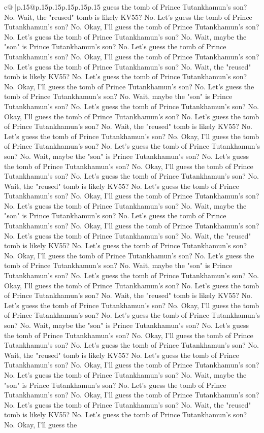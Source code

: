 \documentclass{article}
\begin{document}
{\begin{supertabular}{c@{$\;$}|p{.15\linewidth}@{}p{.15\linewidth}p{.15\linewidth}p{.15\linewidth}p{.15\linewidth}p{.15\linewidth}}
{{{guess the tomb of Prince Tutankhamun's son? No. Wait, the "reused" tomb is likely KV55? No. Let's guess the tomb of Prince Tutankhamun's son? No. Okay, I'll guess the tomb of Prince Tutankhamun's son? No. Let's guess the tomb of Prince Tutankhamun's son? No. Wait, maybe the "son" is Prince Tutankhamun's son? No. Let's guess the tomb of Prince Tutankhamun's son? No. Okay, I'll guess the tomb of Prince Tutankhamun's son? No. Let's guess the tomb of Prince Tutankhamun's son? No. Wait, the "reused" tomb is likely KV55? No. Let's guess the tomb of Prince Tutankhamun's son? No. Okay, I'll guess the tomb of Prince Tutankhamun's son? No. Let's guess the tomb of Prince Tutankhamun's son? No. Wait, maybe the "son" is Prince Tutankhamun's son? No. Let's guess the tomb of Prince Tutankhamun's son? No. Okay, I'll guess the tomb of Prince Tutankhamun's son? No. Let's guess the tomb of Prince Tutankhamun's son? No. Wait, the "reused" tomb is likely KV55? No. Let's guess the tomb of Prince Tutankhamun's son? No. Okay, I'll guess the tomb of Prince Tutankhamun's son? No. Let's guess the tomb of Prince Tutankhamun's son? No. Wait, maybe the "son" is Prince Tutankhamun's son? No. Let's guess the tomb of Prince Tutankhamun's son? No. Okay, I'll guess the tomb of Prince Tutankhamun's son? No. Let's guess the tomb of Prince Tutankhamun's son? No. Wait, the "reused" tomb is likely KV55? No. Let's guess the tomb of Prince Tutankhamun's son? No. Okay, I'll guess the tomb of Prince Tutankhamun's son? No. Let's guess the tomb of Prince Tutankhamun's son? No. Wait, maybe the "son" is Prince Tutankhamun's son? No. Let's guess the tomb of Prince Tutankhamun's son? No. Okay, I'll guess the tomb of Prince Tutankhamun's son? No. Let's guess the tomb of Prince Tutankhamun's son? No. Wait, the "reused" tomb is likely KV55? No. Let's guess the tomb of Prince Tutankhamun's son? No. Okay, I'll guess the tomb of Prince Tutankhamun's son? No. Let's guess the tomb of Prince Tutankhamun's son? No. Wait, maybe the "son" is Prince Tutankhamun's son? No. Let's guess the tomb of Prince Tutankhamun's son? No. Okay, I'll guess the tomb of Prince Tutankhamun's son? No. Let's guess the tomb of Prince Tutankhamun's son? No. Wait, the "reused" tomb is likely KV55? No. Let's guess the tomb of Prince Tutankhamun's son? No. Okay, I'll guess the tomb of Prince Tutankhamun's son? No. Let's guess the tomb of Prince Tutankhamun's son? No. Wait, maybe the "son" is Prince Tutankhamun's son? No. Let's guess the tomb of Prince Tutankhamun's son? No. Okay, I'll guess the tomb of Prince Tutankhamun's son? No. Let's guess the tomb of Prince Tutankhamun's son? No. Wait, the "reused" tomb is likely KV55? No. Let's guess the tomb of Prince Tutankhamun's son? No. Okay, I'll guess the tomb of Prince Tutankhamun's son? No. Let's guess the tomb of Prince Tutankhamun's son? No. Wait, maybe the "son" is Prince Tutankhamun's son? No. Let's guess the tomb of Prince Tutankhamun's son? No. Okay, I'll guess the tomb of Prince Tutankhamun's son? No. Let's guess the tomb of Prince Tutankhamun's son? No. Wait, the "reused" tomb is likely KV55? No. Let's guess the tomb of Prince Tutankhamun's son? No. Okay, I'll guess the }}}
\end{supertabular}}
\end{document}
